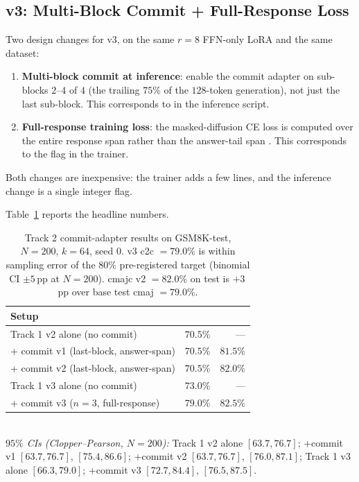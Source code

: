 \subsection{v3: Multi-Block Commit + Full-Response Loss}
\label{subsec:distill_v3}

Two design changes for v3, on the same $r{=}8$ FFN-only LoRA and
the same dataset:

\begin{enumerate}
    \item \textbf{Multi-block commit at inference}: enable the
          commit adapter on sub-blocks $2\text{--}4$ of $4$ (the
          trailing $75\%$ of the $128$-token generation), not just
          the last sub-block.  This corresponds to
           in the inference script.
    \item \textbf{Full-response training loss}: the
          masked-diffusion CE loss is computed over the entire
          response span \code{[prompt\_len, response\_end)}
          rather than the answer-tail span \code{[answer\_start,
          response\_end)}.  This corresponds to the
           flag in the trainer.
\end{enumerate}

Both changes are inexpensive: the trainer adds a few lines, and
the inference change is a single integer flag.

Table~\ref{tab:distill_main} reports the headline numbers.

\begin{table}[h]
\centering
\caption{Track 2 commit-adapter results on GSM8K-test, $N{=}200$,
$k{=}64$, seed $0$.  v3 c2c $= 79.0\%$ is within sampling error of
the $80\%$ pre-registered target (binomial CI $\pm 5$\,pp at
$N{=}200$).  cmajc v2 $= 82.0\%$ on test is $+3$\,pp over base
test cmaj $= 79.0\%$.}
\label{tab:distill_main}
\smallskip
\begin{tabular}{lrr}
\toprule
Setup & \ctwoc{} & \cmajc{} \\
\midrule
Track 1 v2 alone (no commit) & $70.5\%$ & --- \\
+ commit v1 (last-block, answer-span) & $70.5\%$ & $81.5\%$ \\
+ commit v2 (last-block, answer-span) & $70.5\%$ & $\mathbf{82.0\%}$ \\
Track 1 v3 alone (no commit) & $73.0\%$ & --- \\
+ commit v3 ($n{=}3$, full-response) & $\mathbf{79.0\%}$ & $\mathbf{82.5\%}$ \\
\bottomrule
\end{tabular}
\smallskip\\
{\footnotesize\textit{$95\%$ CIs (Clopper--Pearson, $N{=}200$):}
Track 1 v2 alone \ctwoc{} \mbox{$[63.7, 76.7]$};
+commit v1 \ctwoc{} \mbox{$[63.7, 76.7]$}, \cmajc{} \mbox{$[75.4, 86.6]$};
+commit v2 \ctwoc{} \mbox{$[63.7, 76.7]$}, \cmajc{} \mbox{$[76.0, 87.1]$};
Track 1 v3 alone \ctwoc{} \mbox{$[66.3, 79.0]$};
+commit v3 \ctwoc{} \mbox{$[72.7, 84.4]$}, \cmajc{} \mbox{$[76.5, 87.5]$}.}
\end{table}

